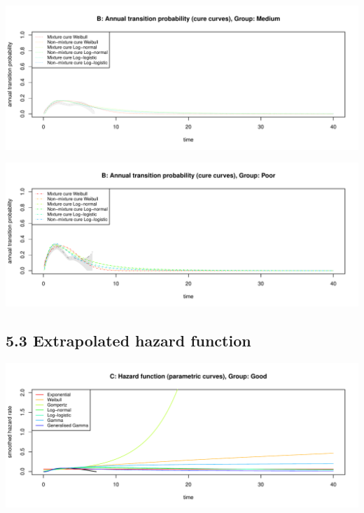 \documentclass[
]{article}
\begin{document}
\begin{flushleft}\includegraphics[height=0.29\textheight]{BC_OS_output/Images/Figure_validate_extrapolation_tp-8} \end{flushleft}

\begin{flushleft}\includegraphics[height=0.29\textheight]{BC_OS_output/Images/Figure_validate_extrapolation_tp-9} \end{flushleft}

\clearpage

\subsection{5.3 Extrapolated hazard
function}\label{extrapolated-hazard-function}

\begin{flushleft}\includegraphics[height=0.29\textheight]{BC_OS_output/Images/Figure_validate_extrapolation_hr-1} \end{flushleft}
\end{document}
